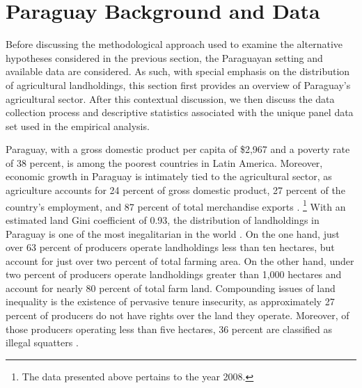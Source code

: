 \documentclass[english]{article}
\begin{document}

\section{Paraguay Background and Data}
\label{sec: data}

Before discussing the methodological approach used to examine the 
alternative hypotheses considered in the previous section, the Paraguayan 
setting and available data are considered.
As such, with special emphasis on the distribution of agricultural landholdings, 
this section first provides an overview of Paraguay's agricultural sector. 
After this contextual discussion, we then discuss the data collection process 
and descriptive statistics associated with the unique panel data set used in the 
empirical analysis.

Paraguay, with a gross domestic product per capita of \$2,967 and a poverty 
rate of 38 percent, is among the poorest countries in Latin America. 
Moreover, economic growth in Paraguay is intimately tied to the agricultural
sector, as agriculture accounts for 24 percent of gross domestic product,
27 percent of the country's employment, and 87 percent of total 
merchandise exports \citep{wdi2012}.%
\footnote{The data presented above pertains to the year 2008.} 
With an estimated land Gini coefficient of 0.93, the distribution of 
landholdings in Paraguay is one of the most inegalitarian in the world 
\citep{lipton2009}. 
On the one hand, just over 63 percent of producers operate landholdings less 
than ten hectares, but account for just over two percent of total farming area.  
On the other hand, under two percent of producers operate landholdings 
greater than 1,000 hectares and account for nearly 80 percent of total farm 
land. 
Compounding issues of land inequality is the existence of pervasive tenure 
insecurity, as approximately 27 percent of producers do not have rights over 
the land they operate.
Moreover, of those producers operating less than five hectares, 36 percent are 
classified as illegal squatters \citep{mag2012}. 
\end{document}

